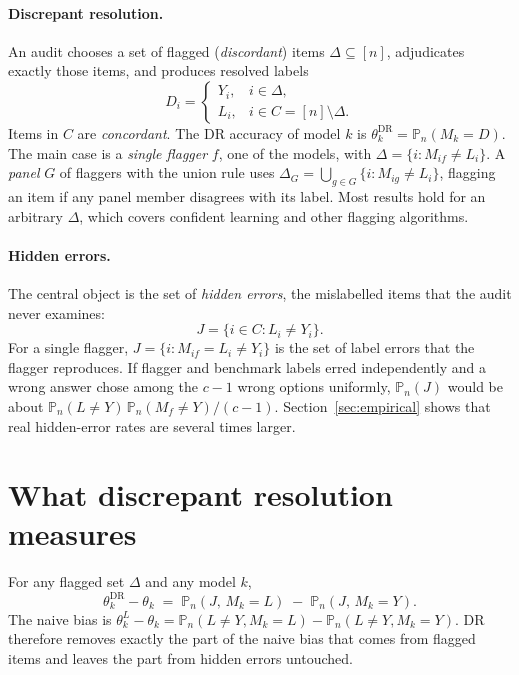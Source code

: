 \documentclass[twoside,11pt]{article}
\newcommand{\Pn}{\mathbb{P}_n}
\newcommand{\1}{\mathbf{1}}
\newcommand{\DR}{\mathrm{DR}}
\newcommand{\Dset}{\Delta}
\newcommand{\Cset}{C}
\begin{document}
\paragraph{Discrepant resolution.} An audit chooses a set of flagged (\emph{discordant}) items $\Dset\subseteq[n]$, adjudicates exactly those items, and produces resolved labels
\[
D_i=\begin{cases}Y_i, & i\in\Dset,\\ L_i, & i\in\Cset=[n]\setminus\Dset.\end{cases}
\]
Items in $\Cset$ are \emph{concordant}. The DR accuracy of model $k$ is $\theta^\DR_k=\Pn(M_k=D)$. The main case is a \emph{single flagger} $f$, one of the models, with $\Dset=\{i:M_{if}\neq L_i\}$. A \emph{panel} $G$ of flaggers with the union rule uses $\Dset_G=\bigcup_{g\in G}\{i:M_{ig}\ne L_i\}$, flagging an item if any panel member disagrees with its label. Most results hold for an arbitrary $\Dset$, which covers confident learning and other flagging algorithms.

\paragraph{Hidden errors.} The central object is the set of \emph{hidden errors}, the mislabelled items that the audit never examines:
\[
J=\{i\in\Cset: L_i\neq Y_i\}.
\]
For a single flagger, $J=\{i: M_{if}=L_i\neq Y_i\}$ is the set of label errors that the flagger reproduces. If flagger and benchmark labels erred independently and a wrong answer chose among the $c-1$ wrong options uniformly, $\Pn(J)$ would be about $\Pn(L\neq Y)\,\Pn(M_f\neq Y)/(c-1)$. Section~\ref{sec:empirical} shows that real hidden-error rates are several times larger.

\section{What discrepant resolution measures}
\label{sec:bias}

\begin{proposition}\label{prop:bias}
For any flagged set $\Dset$ and any model $k$,
\begin{equation}\label{eq:bias}
\theta^\DR_k-\theta_k \;=\; \Pn(J,\,M_k=L)\;-\;\Pn(J,\,M_k=Y).
\end{equation}
The naive bias is $\theta^L_k-\theta_k=\Pn(L\neq Y, M_k=L)-\Pn(L\neq Y, M_k=Y)$. DR therefore removes exactly the part of the naive bias that comes from flagged items and leaves the part from hidden errors untouched.
\end{proposition}
\end{document}
